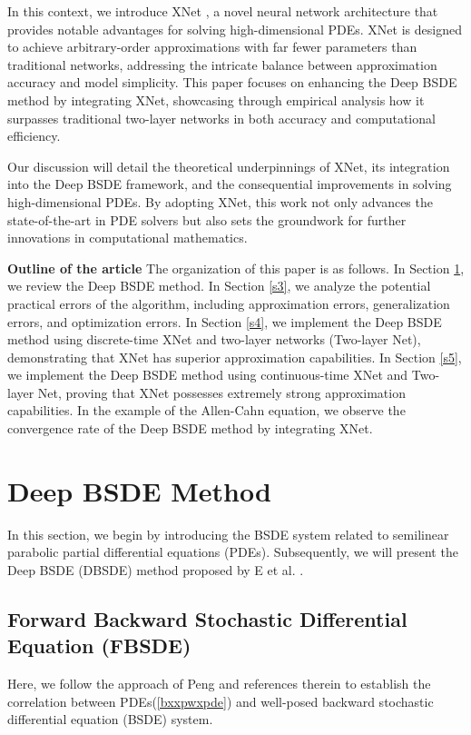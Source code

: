 \documentclass[11pt]{article}
\begin{document}
In this context, we introduce XNet \textsuperscript{\cite{XNet1, XNet2}}, a novel neural network architecture that provides notable advantages for solving high-dimensional PDEs. XNet is designed to achieve arbitrary-order approximations with far fewer parameters than traditional networks, addressing the intricate balance between approximation accuracy and model simplicity. This paper focuses on enhancing 
the Deep BSDE method by integrating XNet, showcasing through empirical analysis how it surpasses traditional two-layer networks in both accuracy and computational efficiency.

Our discussion will detail the theoretical underpinnings of XNet, its integration into the Deep BSDE framework, and the consequential improvements in solving high-dimensional PDEs. By adopting XNet, this work not only advances the state-of-the-art in PDE solvers but also sets the groundwork for further innovations in computational mathematics.



\textbf{Outline of the article}
The organization of this paper is as follows. In Section \ref{s2}, we review the Deep BSDE method. In Section \ref{s3}, we analyze the potential practical errors of the algorithm, including approximation errors, generalization errors, and optimization errors. In Section \ref{s4}, we implement the Deep BSDE method using discrete-time XNet and two-layer networks (Two-layer Net), demonstrating that XNet has superior approximation capabilities. In Section \ref{s5}, we implement the Deep BSDE method using continuous-time XNet and Two-layer Net, proving that XNet possesses extremely strong approximation capabilities. In the example of the Allen-Cahn equation, we observe the convergence rate of the Deep BSDE method by integrating XNet.


\section{Deep BSDE Method} \label{s2}
In this section, we begin by introducing the BSDE system related to semilinear parabolic partial differential equations (PDEs). Subsequently, we will present the Deep BSDE (DBSDE) method proposed by E et al. \textsuperscript{\cite{E2017}}.

\subsection{Forward Backward Stochastic Differential Equation (FBSDE)}
Here, we follow the approach of Peng \textsuperscript{\cite{Peng1,Peng2}} and references therein to establish the correlation between PDEs(\ref{bxxpwxpde}) and well-posed backward stochastic differential equation (BSDE) system.
\end{document}
